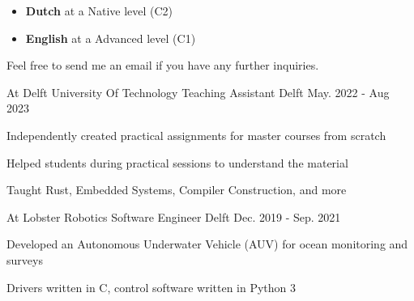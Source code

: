 \documentclass[11pt, a4paper]{awesome-cv}
\begin{document}
\begin{paracol}{2}
	
	\begin{cvparagraph}
		\begin{itemize}[leftmargin=*]
			\item \textbf{Dutch} at a Native level (C2)
			\item \textbf{English} at a Advanced level (C1)
		\end{itemize}
	\end{cvparagraph}


	\begin{cvparagraph}
		Feel free to send me an email if you have any further inquiries.
	\end{cvparagraph}

	
	\switchcolumn
		
	\begin{cventries}
		\cventry
		{At Delft University Of Technology}
		{Teaching Assistant}
		{Delft}
		{May. 2022 - Aug 2023}
		{
			\begin{cvitems}
				\item Independently created practical assignments for master courses from scratch
				\item Helped students during practical sessions to understand the material
				\item Taught Rust, Embedded Systems, Compiler Construction, and more
			\end{cvitems}
		}
		
		\cventry
		{At Lobster Robotics}
		{Software Engineer}
		{Delft}
		{Dec. 2019 - Sep. 2021}
		{
			\begin{cvitems}
				\item {Developed an Autonomous Underwater Vehicle (AUV) for ocean monitoring and surveys }
				\item {Drivers written in C, control software written in Python 3}
			\end{cvitems}
		}
	\end{cventries}

	

\end{paracol}
\end{document}
